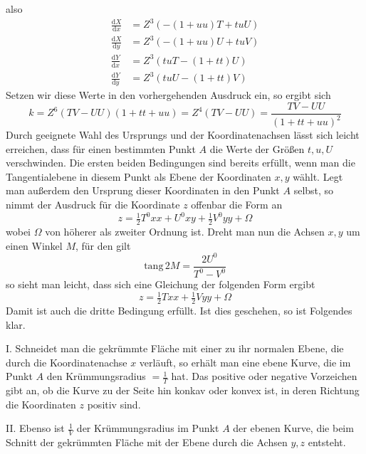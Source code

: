 %
also
\[
\begin{aligned}
\frac{\mathrm{d}X}{\mathrm{d}x}&=Z^3(-(1+uu)T+tuU)\\
\frac{\mathrm{d}X}{\mathrm{d}y}&=Z^3(-(1+uu)U+tuV)\\
\frac{\mathrm{d}Y}{\mathrm{d}x}&=Z^3(tuT-(1+tt)U)\\
\frac{\mathrm{d}Y}{\mathrm{d}y}&=Z^3(tuU-(1+tt)V)
\end{aligned}
\]
Setzen wir diese Werte in den vorhergehenden Ausdruck ein, so ergibt sich
\[
k=Z^6(TV-UU)(1+tt+uu)=Z^4(TV-UU)=\frac{TV-UU}{(1+tt+uu)^2}
\]
Durch geeignete Wahl des Ursprungs und der Koordinatenachsen lässt sich leicht erreichen, dass für einen bestimmten Punkt \(A\) die Werte der Größen \(t,u,U\) verschwinden. Die ersten beiden Bedingungen sind bereits erfüllt, wenn man die Tangentialebene in diesem Punkt als Ebene der Koordinaten \(x,y\) wählt. Legt man außerdem den Ursprung dieser Koordinaten in den Punkt \(A\) selbst, so nimmt der Ausdruck für die Koordinate \(z\) offenbar die Form an
\[
z=\tfrac{1}{2}T^0xx+U^0xy+\tfrac{1}{2}V^0yy+\Omega
\]
wobei \(\Omega\) von höherer als zweiter Ordnung ist. Dreht man nun die Achsen \(x,y\) um einen Winkel \(M\), für den gilt
\[
\mathrm{tang}\,2M=\frac{2U^0}{T^0-V^0}
\]
so sieht man leicht, dass sich eine Gleichung der folgenden Form ergibt
\[
z=\tfrac{1}{2}Txx+\tfrac{1}{2}Vyy+\Omega
\]
Damit ist auch die dritte Bedingung erfüllt. Ist dies geschehen, so ist Folgendes klar.

I. Schneidet man die gekrümmte Fläche mit einer zu ihr normalen Ebene, die durch die Koordinatenachse \(x\) verläuft, so erhält man eine ebene Kurve, die im Punkt \(A\) den Krümmungsradius \(=\frac{1}{T}\) hat. Das positive oder negative Vorzeichen gibt an, ob die Kurve zu der Seite hin konkav oder konvex ist, in deren Richtung die Koordinaten \(z\) positiv sind.

II. Ebenso ist \(\frac{1}{V}\) der Krümmungsradius im Punkt \(A\) der ebenen Kurve, die beim Schnitt der gekrümmten Fläche mit der Ebene durch die Achsen \(y,z\) entsteht.
